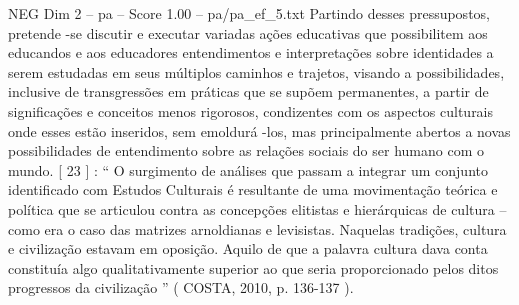 \begin{textsample}{NEG Dim 2 – pa – Score 1.00 – pa/pa\_ef\_5.txt}
Partindo desses pressupostos, pretende -se discutir e executar variadas ações educativas que possibilitem aos educandos e aos educadores entendimentos e interpretações sobre identidades a serem estudadas em seus múltiplos caminhos e trajetos, visando a possibilidades, inclusive de transgressões em práticas que se supõem permanentes, a partir de significações e conceitos menos rigorosos, condizentes com os aspectos culturais onde esses estão inseridos, sem emoldurá -los, mas principalmente abertos a novas possibilidades de entendimento sobre as relações sociais do ser humano com o mundo. [ 23 ] : “ O surgimento de análises que passam a integrar um conjunto identificado com Estudos Culturais é resultante de uma movimentação teórica e política que se articulou contra as concepções elitistas e hierárquicas de cultura – como era o caso das matrizes arnoldianas e levisistas.
Naquelas tradições, cultura e civilização estavam em oposição.
Aquilo de que a palavra cultura dava conta constituía algo qualitativamente superior ao que seria proporcionado pelos ditos progressos da civilização ” ( COSTA, 2010, p. 136-137 ).

\end{textsample}

